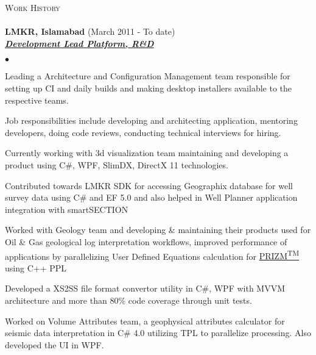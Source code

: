 \documentclass{article}
\newcommand{\lineunder}{\vspace*{-8pt} \\ \hspace*{-18pt} \hrulefill \\}
\newcommand{\header}[1]{{\hspace*{-15pt}\vspace*{6pt} \textsc{#1}} \vspace*{-6pt} \lineunder}
\newcommand{\employer}[3]{{ \textbf{#1} (#2)\\ \underline{\textbf{\emph{#3}}}\\  }}
\newenvironment{achievements}{\begin{list}{$\bullet$}{\topsep 0pt \itemsep -2pt}}{\vspace*{4pt}\end{list}}
\begin{document}
\header{Work History}
\employer{LMKR, Islamabad}{March 2011 - To date}{Development Lead Platform, R\&D}
	\begin{achievements}
	\item Leading a Architecture and Configuration Management team responsible for setting up CI and daily builds and making desktop installers available to the respective teams.
	\item Job responsibilities include developing and architecting application, mentoring developers, doing code reviews, conducting technical interviews for hiring. 
	\item Currently working with 3d visualization team maintaining and developing a product using C\#, WPF, SlimDX, DirectX 11 technologies.
	\item Contributed towards LMKR SDK for accessing Geographix database for well survey data using C\# and EF 5.0 and also helped in Well Planner application integration with smartSECTION
	\item Worked with Geology team and developing \& maintaining their products used for Oil \& Gas geological log interpretation workflows, improved performance of applications by parallelizing User Defined Equations calculation for \href{http://www.lmkr.com/geographix/by-solution/geographix-suite/prizm%E2%84%A2/}{PRIZM\textsuperscript{TM}} using C++ PPL 
	\item Developed a XS2SS file format convertor utility in C\#, WPF with MVVM architecture and more than 80\% code coverage through unit tests.
	\item Worked on Volume Attributes team, a geophysical attributes calculator for seismic data interpretation in C\# 4.0 utilizing TPL to parallelize processing. Also developed the UI in WPF.  
	\end{achievements}
\end{document}
